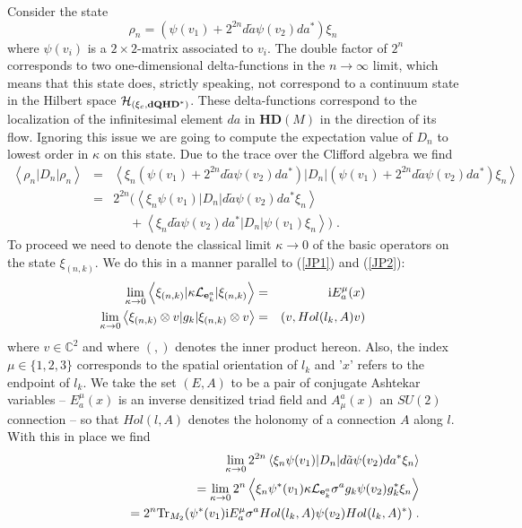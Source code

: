 \documentclass[12pt]{article}
\newcommand{\nn}{\nonumber}
\def\m{\mu}
\def\ch{{\cal H}}
\def\cl{{\cal L}}
\begin{document}
Consider the state 
$$
\rho_n = (\psi(v_1)  +2^{2n} d\tilde{a} \psi(v_2)da^* )\xi_n
$$
where $\psi(v_i)$ is a $2\times 2$-matrix associated to $v_i$.  The double factor of $2^n$ corresponds to two one-dimensional delta-functions in the $n\rightarrow\infty$ limit, which means that this state does, strictly speaking, not correspond to a continuum state in the Hilbert space $\ch_{(\xi_c,\mathbf{dQHD}^*)}$. These delta-functions correspond to the localization of the infinitesimal element $da$ in $\mathbf{HD}(M)$ in the direction of its flow. Ignoring this issue we are going to compute the expectation value of $D_n$ to lowest order in $\kappa$ on this state. 
Due to the trace over the Clifford algebra we find
\begin{eqnarray}
\left\langle \rho_n \vert D_n \vert \rho_n\right\rangle &=&  \left\langle  \xi_n ( \psi(v_1) + 2^{2n} d\tilde{a}  \psi(v_2) da^*) \vert D_n \vert  ( \psi(v_1) + 2^{2n} d\tilde{a} \psi(v_2) da ^*)  \xi_n\right\rangle\nn\\
&=& 
2^{2n}\big(     \left\langle  \xi_n  \psi(v_1)  \vert D_n\vert  d\tilde{a}   \psi(v_2) da^*  \xi_n\right\rangle 
\nn\\&&
\quad\;+
\left\langle  \xi_n   d\tilde{a}  \psi(v_2) da^* \vert D_n\vert   \psi(v_1) \xi_n\right\rangle   \big)\;.
\nn
\end{eqnarray}
To proceed we need to denote the classical limit $\kappa\rightarrow 0$ of the basic operators on the state $\xi_{(n,k)}$. We do this in a manner parallel to (\ref{JP1}) and (\ref{JP2}):
\begin{eqnarray}
\lim_{\kappa\rightarrow 0} \left\langle \xi_{(n,k)} \vert     \kappa \cl_{{\bf e}_k^a}    \vert \xi_{(n,k)}\right\rangle &=& \mathrm{i}E^\m_a (x)
\label{clcondition}
\\
 \lim_{\kappa\rightarrow 0} \left\langle \xi_{(n,k)}\otimes v \vert    g_k   \vert \xi_{(n,k)}\otimes v \right\rangle &=&  ( v, Hol(l_k, A) v) 
\end{eqnarray}
 where $v\in \mathbb{C}^2$ and where $(,)$ denotes the inner product hereon. Also, the index $\m\in\{1,2,3\}$ corresponds to the spatial orientation of $l_k$ and '$x$' refers to the endpoint of $l_k$. We take the set $(E,A)$ to be a pair of conjugate Ashtekar variables -- $E^\m_a(x)$ is an inverse densitized triad field and $A_\m^a(x)$ an $SU(2)$ connection --  so that $Hol(l,A)$ denotes the holonomy of a connection $A$ along $l$. With this in place we find
\begin{eqnarray}
&&\hspace{-1cm}\lim_{\kappa\rightarrow 0} 2^{2n}    \left\langle  \xi_n  \psi(v_1) \vert D_n\vert   d\tilde{a} \psi(v_2)  da^*   \xi_n\right\rangle
\nn\\
&&\hspace{2cm}=
\lim_{\kappa\rightarrow 0} 2^{n}  \left\langle  \xi_n \psi^*(v_1)  \kappa \cl_{{\bf e}_k^a}\sigma^a g_k  \psi(v_2) g^*_k   \xi_n\right\rangle
\nn\\
&&\hspace{2cm}= 2^n  \mbox{Tr}_{M_2} (\psi^*(v_1)  \mathrm{i}E^\m_a \sigma^a Hol(l_k,A)  \psi(v_2) Hol(l_k,A)^* )\;.
\nn
\end{eqnarray}
\end{document}
